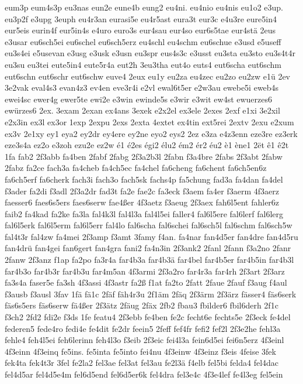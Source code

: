 {eum3p
eum4s3p
eu3nas
eun2e
eune4b
eung2
eu4ni.
eu4nio
eu4nis
eu1o2
e3up.
eu3p2f
e3upg
3euph
eu4r3an
eurasi5e
eu4r5ast
eura3t
eur3c
e4u3re
eure5in4
eur5eis
eurin4f
eur5in4s
e4uro
euro3s
eur4sau
eur4so
eur6s5tae
eur4stä
2eus
e3usar
eu6sch5ei
eu6schel
eu6sch5erz
eu4schl
eu4schm
eu6schue
e3usd
e5useff
eu3s4ei
e5usevan
e3usg
e3usk
e3usn
eu3spr
eus4s3c
e3usst
eu3sta
eu3sto
eu3s4t4r
eu3su
eu3tei
eute5in4
eute5r4a
eut2h
3eu3tha
eut4o
euts4
eut6scha
eut6schm
eut6schn
eut6schr
eut6schw
euve4
2eux
eu1y
eu2za
eu4zec
eu2zo
eu2zw
e1ü
2ev
3e2vak
eval4s3
evan4z3
ev4en
eve3r4i
e2vl
ewal6t5er
e2w3au
ewebe5i
eweb4s
ewei4sc
ewer4g
ewer5te
ewi2e
e3win
ewinde5s
e3wir
e3wit
ew4st
ewuerzes6
ewürzes6
2ex.
3exam
2exan
ex4ans
3exek
e2x2el
ex3ele
2exes
2exf
e1xi
3e2xil
e2x3in
ex3l
ex3or
1exp
2expu
2exs
2exta
4extet
ex4tin
ext5rei
2extv
2exu
e2xum
ex3v
2e1xy
ey1
eya2
ey2dr
ey4ere
ey2ne
eyo2
eys2
2ez
e3za
e4z3enn
eze3re
ez3erk
eze3s4a
ez2o
e3zoh
ezu2e
ez2w
é1
é2es
égi2
élu2
ém2
ér2
éu2
è1
ène1
2ët
ê1
ê2t
1fa
fab2
2f3abb
fa4ben
2fabf
2fabg
2f3a2b3l
2fabn
f3a4bre
2fabs
2f3abt
2fabw
2fabz
fa2ce
fach3a
fa4cheb
fa4ch5ec
fa4chel
fa6cheng
fa6chent
fa6ch5en6z
fa6ch5erf
fa6cherk
fach3i
fach3o
fach5sk
fachs4p
fa5chung
fad3a
fa4dan
fa4del
f3ader
fa2di
f3adl
2f3a2dr
fad3t
fa2e
fae2c
fa3eck
f3aem
fa4er
f3aerm
4f3aerz
faesser6
faes6s5ers
faes6serw
fae4ßer
4f3aetz
f3aeug
2f3aex
fah6l5ent
fahler6z
faib2
fa4kad
fa2ke
fa3la
fal4k3l
fal4l3a
fal4l5ei
faller4
fal6l5ere
fal6lerf
fal6lerg
fal6l5erk
fal6l5erm
fal6l5err
fal4lo
fal6scha
fal6schei
fal6sch5l
fal6schm
fal6sch5w
fal4t3r
fal4zw
fa4mei
2f3amp
f3amt
3famy
f4an.
fa4nar
fan4d5er
fan4dre
fan4d5ru
fan4drü
fan4gei
fan6gert
fan4gra
fani2
fa4n3in
2f3ank2
2fanl
2fann
f3a2no
2fanr
2fanw
2f3anz
f1ap
fa2po
fa3r4a
far4b3a
far4b3ä
far4bel
far4b5er
far4b5in
far4b3l
far4b3o
far4b3r
far4b3u
far4m5an
4f3armi
2f3a2ro
far4r3a
far4rh
2f3art
2f3arz
fa3s4a
faser5e
fa3sh
4f3assi
4f3astr
fa2ß
f1at
fa2to
2fatt
2faue
2fauf
f3aug
f4aul
f3ausb
f3ausl
3fav
1fä
fä1c
2fäf
fäh4r3u
2f1äm
2fäq
2f3ärm
2f3ärz
fässer4
fäs6serk
fäs6s5ers
fäs6serw
fä4ßer
2f3ätz
2fäug
2fäx
2fb2
fbau3
fbilder6
fbil6derh
2f1c
f3ch2
2fd2
fdi2e
f3ds
1fe
featu4
2f3ebb
fe4ben
fe2c
fecht6e
fechts5e
2f3eck
fe4del
federen5
fede4ro
fedi4e
fe4dit
fe2dr
feein5
2feff
fef4fr
fefi2
fef2l
2f3e2he
fehl3a
fehle4
feh4l5ei
feh6lerinn
feh4l3o
f3eib
2f3eic
fei4l3a
fein6d5ei
fei6n5erz
4f3einl
4f3einn
4f3einq
fe5ins.
fe5inta
fe5into
fei4nu
4f3einw
4f3einz
f3eis
4feise
3fek
fek4ta
fek4t3r
3fel
fe2la2
fel3ae
fel3at
fel3au
fe2l3ä
f4elb
fel5bi
felda4
fel4dac
fel4d5ar
fel4d5e4m
fel6d5end
fel6d5er6k
fel4dra
fel3e4c
4f3e4lef
fe4l3eg
fel5ein
}
